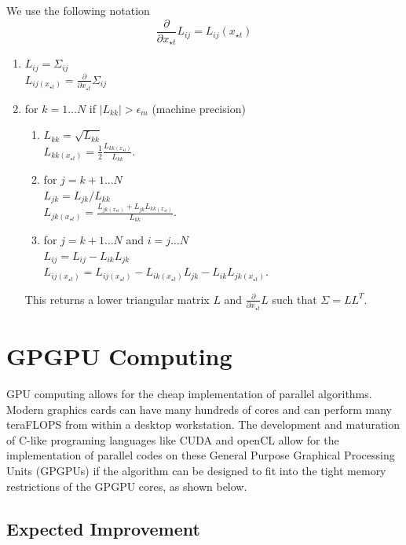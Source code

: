 \documentclass[phd,tocprelim]{cornell}
\begin{document}
We use the following notation
\begin{equation}
    \frac{\partial}{\partial x_{\star t}} L_{ij} = L_{ij} (x_{\star t})
\end{equation}
\begin{enumerate}
 \item $L_{ij} = \Sigma_{ij}$ \\
       $L_{ij (x_{\star t})} = \frac{\partial}{\partial x_{\star t}} \Sigma_{ij}$
 \item for $k = 1\ldots N$ if $|L_{kk}| > \epsilon_{m}$ (machine precision)
 \begin{enumerate}
  \item $L_{kk} = \sqrt{L_{kk}}$ \\
	$L_{kk (x_{\star t})} = \frac{1}{2} \frac{L_{kk (x_{\star t})}}{L_{kk}}$.
  \item for $j = k+1\ldots N$ \\
	$L_{jk} = L_{jk}/L_{kk}$ \\
	$L_{jk (x_{\star t})} = \frac{L_{jk (x_{\star t})} + L_{jk}L_{kk (x_{\star t})}}{L_{kk}}$.
  \item for $j = k+1\ldots N$ and $i = j\ldots N$ \\
	$L_{ij} = L_{ij} - L_{ik}L_{jk}$ \\
	$L_{ij (x_{\star t})} = L_{ij (x_{\star t})} - L_{ik (x_{\star t})}L_{jk} - L_{ik}L_{jk (x_{\star t})}$.
 \end{enumerate}

This returns a lower triangular matrix $L$ and $\frac{\partial}{\partial x_{\star t}} L$ such that $\Sigma = LL^{T}$.

\end{enumerate}

\section{GPGPU Computing} %
\label{sec:GPGPU Computing}

GPU computing allows for the cheap implementation of parallel algorithms. Modern graphics cards can have many hundreds of cores and can perform many teraFLOPS from within a desktop workstation. The development and maturation of C-like programing languages like CUDA and openCL allow for the implementation of parallel codes on these General Purpose Graphical Processing Units (GPGPUs) if the algorithm can be designed to fit into the tight memory restrictions of the GPGPU cores, as shown below.

\subsection{Expected Improvement}
\label{GPUEI}
\end{document}
